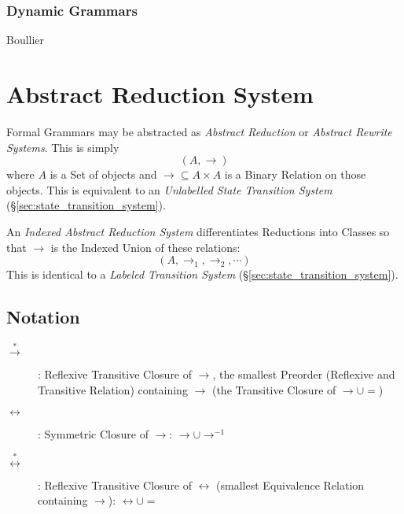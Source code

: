 \subsubsection{Dynamic Grammars}

Boullier\cite{boullier94}



\section{Abstract Reduction System}\label{sec:abstract_rewrite}

Formal Grammars may be abstracted as \emph{Abstract Reduction} or
\emph{Abstract Rewrite Systems}. This is simply
    \[(A,\rightarrow)\]
where $A$ is a Set of objects and $\rightarrow \subseteq A \times A$
is a Binary Relation on those objects. This is equivalent to an
\emph{Unlabelled State Transition System}
(\S\ref{sec:state_transition_system}).

An \emph{Indexed Abstract Reduction System} differentiates Reductions
into Classes so that $\rightarrow$ is the Indexed Union of these
relations:
    \[(A, \rightarrow_1, \rightarrow_2, \cdots)\]
This is identical to a \emph{Labeled Transition System}
(\S\ref{sec:state_transition_system}).



\subsection{Notation}\label{sec:rewrite_notation}

\begin{description}

\item [$\stackrel{*}{\rightarrow}$]: Reflexive Transitive Closure of
  $\rightarrow$, the smallest Preorder (Reflexive and Transitive
  Relation) containing $\rightarrow$ (the Transitive Closure of
  $\rightarrow \cup =$)

\item [$\leftrightarrow$]: Symmetric Closure of $\rightarrow$:
  $\rightarrow \cup \rightarrow^{-1}$

\item [$\stackrel{*}{\leftrightarrow}$]: Reflexive Transitive Closure
  of $\leftrightarrow$ (smallest Equivalence Relation containing
  $\rightarrow$): $\leftrightarrow \cup =$

\end{description}



